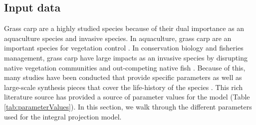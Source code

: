 \documentclass{article}[12pt]
\begin{document}

\subsection{Input data}\label{sec:Input}

Grass carp are a highly studied species because of their dual importance as an aquaculture species and invasive species.
In aquaculture, grass carp are an important species for vegetation control \citep{chilton1992biology}. 
In conservation biology and fisheries management, grass carp have large impacts as an invasive species by disrupting native vegetation communities and out-competing native fish \citep{chapman2013first, wittmann2014grass}. 
Because of this, many studies have been conducted that provide specific parameters as well as large-scale synthesis pieces that cover the life-history of the species \citep[e.g.,][]{shireman1983synopsis}.
This rich literature source has provided a source of parameter values for the model (Table \ref{tab:parameterValues}).
In this section, we walk through the different parameters used for the integral projection model.
\end{document}
